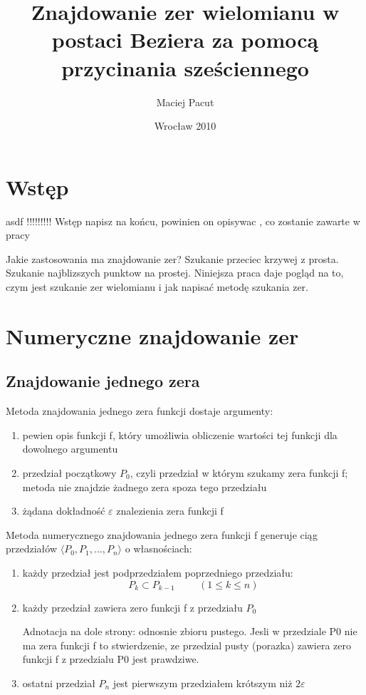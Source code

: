 \documentclass[11pt,a4paper,oneside]{report}
\title{Znajdowanie zer wielomianu w postaci Beziera za pomocą przycinania sześciennego}
\author{Maciej Pacut}
\date{Wrocław 2010}
\begin{document}
\maketitle
\newpage

\section{Wstęp}

asdf
!!!!!!!!! Wstęp napisz na końcu, powinien on opisywac , co zostanie zawarte w pracy

Jakie zastosowania ma znajdowanie zer? Szukanie przeciec krzywej z prosta. Szukanie najblizszych punktow na prostej.
Niniejsza praca daje pogląd na to, czym jest szukanie zer wielomianu i jak napisać metodę szukania zer.

\section{Numeryczne znajdowanie zer}

\subsection{Znajdowanie jednego zera}

Metoda znajdowania jednego zera funkcji dostaje argumenty:
\begin{enumerate}
\item pewien opis funkcji f, który umożliwia obliczenie wartości tej funkcji dla dowolnego argumentu
\item przedział początkowy $P_0$, czyli przedział w którym szukamy zera funkcji f; metoda nie znajdzie żadnego zera spoza tego przedziału
\item żądana dokładność $\varepsilon$ znalezienia zera funkcji f
\end{enumerate}

Metoda numerycznego znajdowania jednego zera funkcji f generuje ciąg przedziałów $\langle P_0, P_1, ..., P_n\rangle$ o własnościach:
\begin{enumerate}
\item każdy przedział jest podprzedziałem poprzedniego przedziału:
$$P_k \subset P_{k-1}\hspace{1cm}(1 \leq k \leq n)$$
\item każdy przedział zawiera zero funkcji f z przedziału $P_0$

Adnotacja na dole strony: odnosnie zbioru pustego. Jesli w przedziale P0 nie ma zera funkcji f to stwierdzenie, ze przedzial pusty (porazka) zawiera zero funkcji f z przedzialu P0 jest prawdziwe.

\item ostatni przedział $P_n$ jest pierwszym przedziałem krótszym niż $2 \varepsilon$
\end{enumerate}
\end{document}
